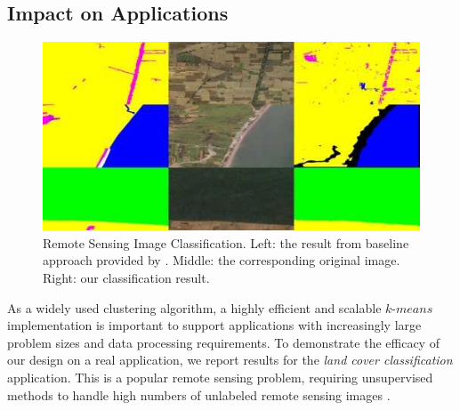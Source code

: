 


\subsection{Impact on Applications}

\begin{figure}
\centering
\includegraphics[scale=0.40]{lc1.jpg}
\caption{Remote Sensing Image Classification. Left: the result from baseline approach provided by \cite{demir2018deepglobe}. Middle: the corresponding original image. Right: our classification result. 
}
\label{lc}
\end{figure}

As a widely used clustering algorithm, a highly efficient and scalable $k$-$means$ implementation is important to support applications with increasingly large problem sizes and data processing requirements. To demonstrate the efficacy of our design on a real application, we report results for the \textit{land cover classification} application. This is a popular remote sensing problem, requiring unsupervised methods to handle high numbers of unlabeled remote sensing images \cite{li2016stacked}.

